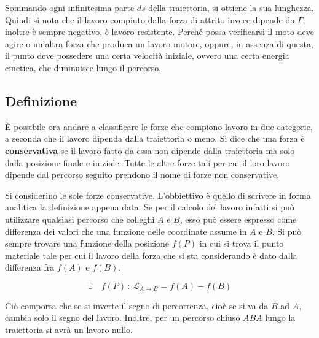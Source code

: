 \begin{figure}[htpb]
\end{figure}
\FloatBarrier
Sommando ogni infinitesima parte $ds$ della traiettoria, si ottiene la sua lunghezza. Quindi si nota che il lavoro compiuto dalla forza di attrito invece dipende da $\Gamma$, inoltre è sempre negativo, è lavoro resistente. Perché possa verificarsi il moto deve agire o un'altra forza che produca un lavoro motore, oppure, in assenza di questa, il punto deve possedere una certa velocità iniziale, ovvero una certa energia cinetica, che diminuisce lungo il percorso.

\subsection{Definizione}

È possibile ora andare a classificare le forze che compiono lavoro in due categorie, a seconda che il lavoro dipenda dalla traiettoria o meno.
Si dice che una forza è \textbf{conservativa} se il lavoro fatto da essa non dipende dalla traiettoria ma solo dalla posizione finale e iniziale. Tutte le altre forze tali per cui il loro lavoro dipende dal percorso seguito prendono il nome di forze non conservative.

Si considerino le sole forze conservative. L'obbiettivo è quello di scrivere in forma analitica la definizione appena data. Se per il calcolo del lavoro infatti si può utilizzare qualsiasi percorso che colleghi $A$ e $B$, esso può essere espresso come differenza dei valori che una funzione delle coordinate assume in $A$ e $B$. Si può sempre trovare una funzione della posizione $f(P)$ in cui si trova il punto materiale tale per cui il lavoro della forza che si sta considerando è dato dalla differenza fra $f(A)$ e $f(B)$.

\[
	\exists \quad f(P)\,: \, \mathcal{L}_{A \to B}= f(A)-f(B)
\]

Ciò comporta che se si inverte il segno di percorrenza, cioè se si va da $B$ ad $A$, cambia solo il segno del lavoro. Inoltre, per un percorso chiuso $ABA$ lungo la traiettoria si avrà un lavoro nullo.


